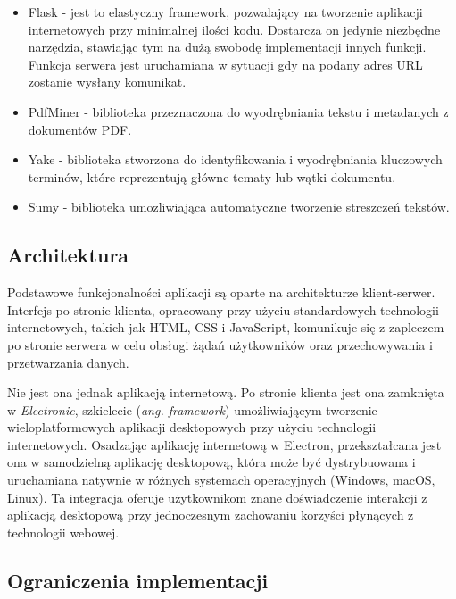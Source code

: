 \documentclass[12pt,a4paper,twoside]{article}
\begin{document}
\begin{itemize}
	\item Flask - jest to elastyczny framework, pozwalający na tworzenie aplikacji internetowych przy minimalnej ilości kodu. Dostarcza on jedynie niezbędne narzędzia, stawiając tym na dużą swobodę implementacji innych funkcji. Funkcja serwera jest uruchamiana w sytuacji gdy na podany adres URL zostanie wysłany komunikat.
	\item PdfMiner - biblioteka przeznaczona do wyodrębniania tekstu i metadanych z dokumentów PDF. 
	\item Yake - biblioteka stworzona do identyfikowania i wyodrębniania kluczowych terminów, które reprezentują główne tematy lub wątki dokumentu.
	\item Sumy - biblioteka umozliwiająca automatyczne tworzenie streszczeń tekstów.
\end{itemize}
\subsection{Architektura}
Podstawowe funkcjonalności aplikacji są oparte na architekturze klient-serwer. Interfejs po stronie klienta, opracowany przy użyciu standardowych technologii internetowych, takich jak HTML, CSS i JavaScript, komunikuje się z zapleczem po stronie serwera w celu obsługi żądań użytkowników oraz przechowywania i przetwarzania danych.\par
Nie jest ona jednak aplikacją internetową. Po stronie klienta jest ona zamknięta w \textit{Electronie}, szkielecie (\textit{ang. framework}) umożliwiającym tworzenie wieloplatformowych aplikacji desktopowych przy użyciu technologii internetowych. Osadzając aplikację internetową w Electron, przekształcana jest ona w samodzielną aplikację desktopową, która może być dystrybuowana i uruchamiana natywnie w różnych systemach operacyjnych (Windows, macOS, Linux). Ta integracja oferuje użytkownikom znane doświadczenie interakcji z aplikacją desktopową przy jednoczesnym zachowaniu korzyści płynących z technologii webowej.
\subsection{Ograniczenia implementacji}
\end{document}
